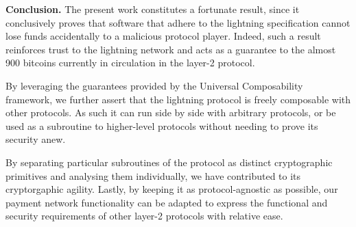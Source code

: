  
 \medskip
  {\bf Conclusion.} The present work constitutes a fortunate result, since it conclusively
  proves that software that adhere to the lightning specification cannot lose
  funds accidentally to a malicious protocol player. Indeed, such a result
  reinforces trust to the lightning network and acts as a guarantee to the
  almost 900 bitcoins currently in circulation in the layer-2 protocol.

  By leveraging the guarantees provided by the Universal Composability
  framework, we further assert that the lightning protocol is freely composable
  with other protocols. As such it can run side by side with arbitrary
  protocols, or be used as a subroutine to higher-level protocols without
  needing to prove its security anew.

  By separating particular subroutines of the protocol as distinct
  cryptographic primitives and analysing them individually, we have contributed
  to its cryptorgaphic agility. Lastly, by keeping it as protocol-agnostic as
  possible, our payment network functionality can be adapted to express the
  functional and security requirements of other layer-2 protocols with relative
  ease.
